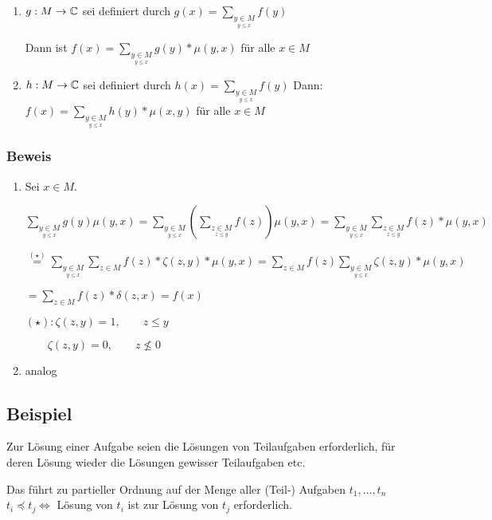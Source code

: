 	\begin{enumerate}
		\item 	$g:M \rightarrow \operatorname{\mathbb{C}}$ sei definiert durch $g(x) = \sum_{\underset{y\leq x}{y \in M} } f(y)$
		
		Dann ist $f(x) = \sum_{\underset{y\leq x}{y \in M}}	g(y) * \mu (y,x)$ für alle $x \in M$
		
		\item 	$h: M \rightarrow \operatorname{\mathbb{C}}$ sei definiert durch $h(x)= \sum_{\underset{y\leq x}{y \in M}}f(y)$ Dann: 	$f(x)= \sum_{\underset{y\leq x}{y \in M}} h(y)*\mu (x,y)$ für alle $x \in M$ 
		
	\end{enumerate}
	
	\subsubsection*{Beweis}
	\begin{enumerate}
		\item Sei $x \in M$.
		
		$\sum_{\underset{y\leq x}{y \in M}} g(y) \mu (y,x) = \sum_{\underset{y\leq x}{y \in M}}(\sum_{\underset{z\leq y}{z \in M}}f(z))\mu (y,x) = \sum_{\underset{y\leq x}{y \in M}}\sum_{\underset{z\leq y}{z \in M}} f(z) * \mu(y,x) $
		
		$\overset{(\star)}{=} \sum_{\underset{y\leq x}{y \in M}} \sum_{z \in M} f(z) * \zeta (z,y) * \mu (y,x) = \sum_{z \in M}f(z) \sum_{\underset{y\leq x}{y \in M}} \zeta (z,y)*\mu(y,x)$
		
		$= \sum_{z\in M} f(z)*\delta(z,x)=f(x)$
		
		$(\star): \zeta(z,y) = 1, \qquad z \leq y$
		
		$\qquad \zeta(z,y) = 0, \qquad z \nleq 0$
		\item analog
	\end{enumerate}
	
		\subsection{Beispiel} %
		
		Zur Lösung einer Aufgabe seien die Lösungen von Teilaufgaben erforderlich, für deren Lösung wieder die Lösungen gewisser Teilaufgaben etc.
		
		Das führt zu partieller Ordnung auf der Menge aller (Teil-) Aufgaben $t_1, \dots, t_n$
		\\ $t_i \preceq t_j \Leftrightarrow$ Lösung von $t_i$ ist zur Lösung von $t_j$ erforderlich.
		
